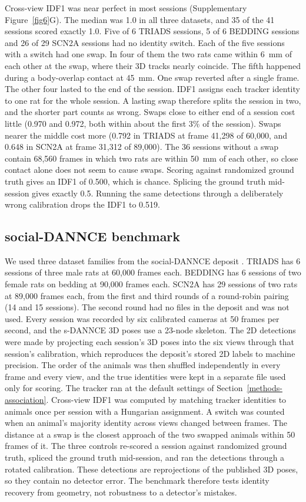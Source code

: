 \documentclass[pdflatex, sn-nature]{sn-jnl}
\theoremstyle{thmstyleone}%
\theoremstyle{thmstyletwo}%
\theoremstyle{thmstylethree}%
\begin{document}
Cross-view IDF1 was near perfect in most sessions (Supplementary Figure~\ref{fig6}G). The median was 1.0 in all three datasets, and 35 of the 41 sessions scored exactly 1.0. Five of 6 TRIADS sessions, 5 of 6 BEDDING sessions and 26 of 29 SCN2A sessions had no identity switch. Each of the five sessions with a switch had one swap. In four of them the two rats came within 6~mm of each other at the swap, where their 3D tracks nearly coincide. The fifth happened during a body-overlap contact at 45~mm. One swap reverted after a single frame. The other four lasted to the end of the session. IDF1 assigns each tracker identity to one rat for the whole session. A lasting swap therefore splits the session in two, and the shorter part counts as wrong. Swaps close to either end of a session cost little (0.970 and 0.972, both within about the first 3\% of the session). Swaps nearer the middle cost more (0.792 in TRIADS at frame 41,298 of 60,000, and 0.648 in SCN2A at frame 31,312 of 89,000). The 36 sessions without a swap contain 68,560 frames in which two rats are within 50~mm of each other, so close contact alone does not seem to cause swaps. Scoring against randomized ground truth gives an IDF1 of 0.500, which is chance. Splicing the ground truth mid-session gives exactly 0.5. Running the same detections through a deliberately wrong calibration drops the IDF1 to 0.519.

\subsection{social-DANNCE benchmark}\label{methods-sdannce}

We used three dataset families from the social-DANNCE deposit \citep{Klibaite2025}. TRIADS has 6 sessions of three male rats at 60,000 frames each. BEDDING has 6 sessions of two female rats on bedding at 90,000 frames each. SCN2A has 29 sessions of two rats at 89,000 frames each, from the first and third rounds of a round-robin pairing (14 and 15 sessions). The second round had no files in the deposit and was not used. Every session was recorded by six calibrated cameras at 50 frames per second, and the s-DANNCE 3D poses use a 23-node skeleton. The 2D detections were made by projecting each session's 3D poses into the six views through that session's calibration, which reproduces the deposit's stored 2D labels to machine precision. The order of the animals was then shuffled independently in every frame and every view, and the true identities were kept in a separate file used only for scoring. The tracker ran at the default settings of Section~\ref{methods-association}. Cross-view IDF1 was computed by matching tracker identities to animals once per session with a Hungarian assignment. A switch was counted when an animal's majority identity across views changed between frames. The distance at a swap is the closest approach of the two swapped animals within 50 frames of it. The three controls re-scored a session against randomized ground truth, spliced the ground truth mid-session, and ran the detections through a rotated calibration. These detections are reprojections of the published 3D poses, so they contain no detector error. The benchmark therefore tests identity recovery from geometry, not robustness to a detector's mistakes.
\end{document}
